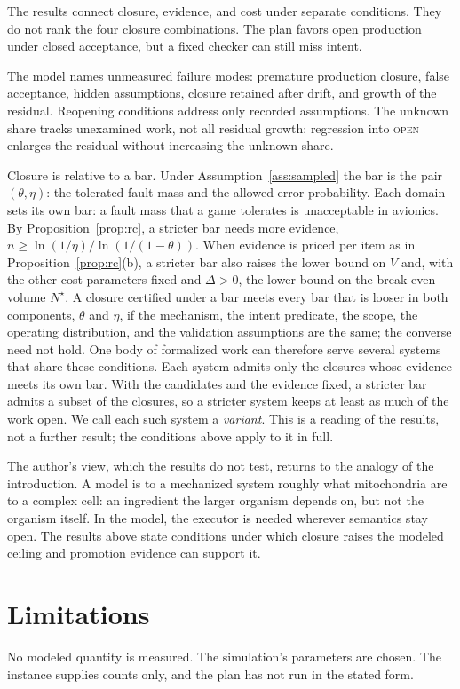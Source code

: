 \documentclass[11pt]{article}
\theoremstyle{definition}
\theoremstyle{remark}
\newcommand{\cstate}[1]{\textup{\textsc{#1}}}
\begin{document}
The results connect closure, evidence, and cost under separate conditions.
They do not rank the four closure combinations.
The plan favors open production under closed acceptance, but a fixed checker can still miss intent.

The model names unmeasured failure modes: premature production closure, false acceptance,
hidden assumptions, closure retained after drift, and growth of the residual.
Reopening conditions address only recorded assumptions.
The unknown share tracks unexamined work, not all residual growth:
regression into \cstate{open} enlarges the residual without increasing the unknown share.

Closure is relative to a bar. Under Assumption~\ref{ass:sampled} the bar is the pair
$(\theta,\eta)$: the tolerated fault mass and the allowed error probability. Each domain sets its
own bar: a fault mass that a game tolerates is unacceptable in avionics. By
Proposition~\ref{prop:rc}, a stricter bar needs more evidence, $n\ge\ln(1/\eta)/\ln(1/(1-\theta))$.
When evidence is priced per item as in Proposition~\ref{prop:rc}(b), a stricter bar also raises the
lower bound on $V$ and, with the other cost parameters fixed and $\Delta>0$, the lower bound on the
break-even volume $N^\star$. A closure certified under a bar meets every bar that is looser in both
components, $\theta$ and $\eta$, if the mechanism, the intent predicate, the scope, the operating
distribution, and the validation assumptions are the same; the converse need not hold. One body of
formalized work can therefore serve several systems that share these conditions. Each system admits
only the closures whose evidence meets its own bar. With the candidates and the evidence fixed, a
stricter bar admits a subset of the closures, so a stricter system keeps at least as much of the work
open. We call each such system a \emph{variant}. This is a reading of the results, not a further
result; the conditions above apply to it in full.

The author's view, which the results do not test, returns to the analogy of the introduction.
A model is to a mechanized system roughly what mitochondria are to a complex cell: an ingredient
the larger organism depends on, but not the organism itself. In the model, the executor is needed
wherever semantics stay open.
The results above state conditions under which closure raises the modeled ceiling and promotion
evidence can support it.

\section{Limitations}\label{sec:limitations}
No modeled quantity is measured. The simulation's parameters are chosen.
The instance supplies counts only, and the plan has not run in the stated form.
\end{document}
